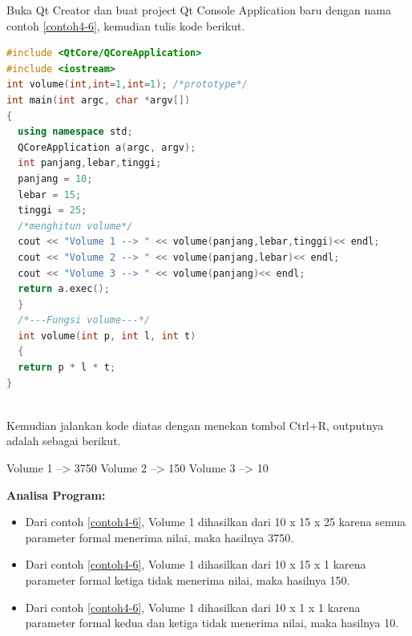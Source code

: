 Buka Qt Creator dan buat project Qt Console Application baru dengan nama
contoh \ref{contoh4-6}, kemudian tulis kode berikut.

\begin{lstlisting}[language=c++, caption=Default Parameter, label=contoh4-6]
#include <QtCore/QCoreApplication>
#include <iostream>
int volume(int,int=1,int=1); /*prototype*/
int main(int argc, char *argv[])
{
  using namespace std;
  QCoreApplication a(argc, argv);
  int panjang,lebar,tinggi;
  panjang = 10;
  lebar = 15;
  tinggi = 25;
  /*menghitun volume*/
  cout << "Volume 1 --> " << volume(panjang,lebar,tinggi)<< endl;
  cout << "Volume 2 --> " << volume(panjang,lebar)<< endl;
  cout << "Volume 3 --> " << volume(panjang)<< endl;
  return a.exec();
  }
  /*---Fungsi volume---*/
  int volume(int p, int l, int t)
  {
  return p * l * t;
}
   
\end{lstlisting}

Kemudian jalankan kode diatas dengan menekan tombol Ctrl+R, outputnya
adalah sebagai berikut.
\begin{lcverbatim}
 Volume 1 --> 3750
 Volume 2 --> 150
 Volume 3 -->  10
\end{lcverbatim}


\textbf{Analisa Program:}

\begin{itemize}

\item
  Dari contoh \ref{contoh4-6}, Volume 1 dihasilkan dari 10 x 15 x 25 karena
  semua parameter formal menerima nilai, maka hasilnya 3750.
\item
  Dari contoh \ref{contoh4-6}, Volume 1 dihasilkan dari 10 x 15 x 1 karena
  parameter formal ketiga tidak menerima nilai, maka hasilnya 150.
\item
  Dari contoh \ref{contoh4-6}, Volume 1 dihasilkan dari 10 x 1 x 1 karena
  parameter formal kedua dan ketiga tidak menerima nilai, maka hasilnya
  10.
\end{itemize}
